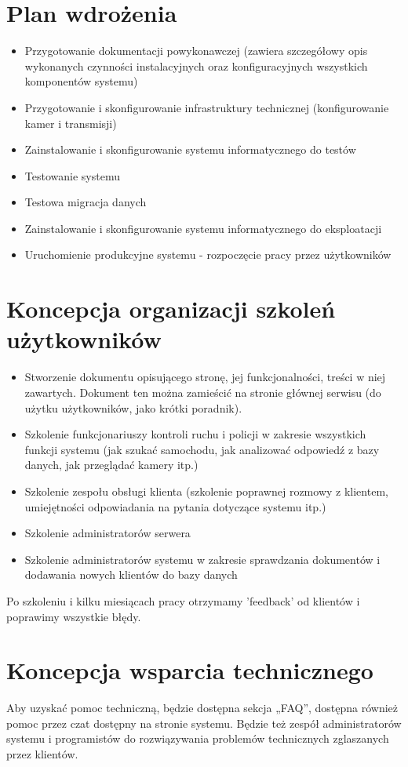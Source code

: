\documentclass[12pt]{article}
\begin{document}
\section{Plan wdrożenia}

\begin{itemize}
	\item Przygotowanie dokumentacji powykonawczej (zawiera szczegółowy opis wykonanych czynności instalacyjnych oraz konfiguracyjnych
wszystkich komponentów systemu)
	\item Przygotowanie i skonfigurowanie infrastruktury technicznej (konfigurowanie kamer i transmisji)
	\item Zainstalowanie i skonfigurowanie systemu informatycznego do testów
	\item Testowanie systemu
	\item Testowa migracja danych
	\item Zainstalowanie i skonfigurowanie systemu informatycznego do eksploatacji
	\item Uruchomienie produkcyjne systemu - rozpoczęcie pracy przez użytkowników
\end{itemize}


\section{Koncepcja organizacji szkoleń użytkowników}
	\begin{itemize}
    \item Stworzenie dokumentu opisującego stronę, jej funkcjonalności, treści w niej
	zawartych. Dokument ten można zamieścić na stronie głównej serwisu (do użytku
	użytkowników, jako krótki poradnik).
    \item Szkolenie funkcjonariuszy kontroli ruchu i policji w zakresie wszystkich funkcji systemu (jak szukać samochodu, jak analizować odpowiedź z bazy danych, jak przeglądać kamery itp.)
	\item Szkolenie zespołu obsługi klienta (szkolenie poprawnej rozmowy z klientem, umiejętności odpowiadania na pytania dotyczące systemu itp.)
    \item Szkolenie administratorów serwera
	\item Szkolenie administratorów systemu w zakresie sprawdzania dokumentów i dodawania nowych 
	klientów do bazy danych
    \end{itemize}
Po szkoleniu i kilku miesiącach pracy otrzymamy 'feedback' od klientów i poprawimy wszystkie błędy.


\section{Koncepcja wsparcia technicznego}
Aby uzyskać pomoc techniczną, będzie dostępna sekcja „FAQ”, dostępna również pomoc przez czat dostępny na stronie systemu.
Będzie też zespół administratorów systemu i programistów do rozwiązywania problemów technicznych zglaszanych przez klientów.
\end{document}

